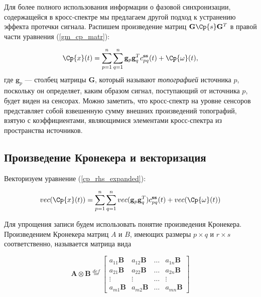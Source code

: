 Для более полного использования информации о фазовой синхронизации, содержащейся в кросс-спектре
мы предлагаем другой подход к устранению эффекта протечки сигнала.
Распишем  произведение матриц $\mathbf{G} \Cp{s} \mathbf{G}^T$ в правой части уравнения (\ref{gm_cp_matr}):

\begin{gather}
    \Cp{x}(t) = \sum\limits_{p=1}^n\sum\limits_{q=1}^n\mathbf{g}_p\mathbf{g}_q^T c_{pq}^{\mathbf{ss}}(t) + \Cp{\omega}(t),
    \label{cp_rhs_expanded}
\end{gather}
где $\mathbf{g}_p$ --- столбец матрицы $\mathbf{G}$, который называют \emph{топографией} источника $p$,
поскольку он определяет, каким образом сигнал, поступающий от источника $p$, будет виден на сенсорах.
Можно заметить, что кросс-спектр на уровне сенсоров представляет собой взвешенную сумму внешних произведений топографий,
взятую с коэффициентами, являющимися элементами кросс-спектра из пространства источников.

\subsection{Произведение Кронекера и векторизация}
Векторизуем уравнение (\ref{cp_rhs_expanded}):

\begin{gather}
    vec(\Cp{x}(t)) = \sum\limits_{p=1}^n\sum\limits_{q=1}^n vec(\mathbf{g}_p\mathbf{g}_q^T) c_{pq}^{\mathbf{ss}}(t) + vec(\Cp{\omega}(t))
    \label{cp_rhs_vec}
\end{gather}

Для упрощения записи будем использовать понятие произведения Кронекера.
Произведением Кронекера матриц $A$ и $B$, имеющих размеры $p\times q$ и $r\times s$ соответственно, называется матрица вида

\begin{equation}
    \mathbf{A} \otimes \mathbf{B} \stackrel{def}{=}
    \begin{bmatrix}
        a_{11} \mathbf{B} & a_{12} \mathbf{B} & \dots & a_{1n} \mathbf{B} \\
        a_{21} \mathbf{B} & a_{22} \mathbf{B} & \dots & a_{2n} \mathbf{B} \\
        \vdots            & \vdots            & \dots & \vdots            \\
        a_{m1} \mathbf{B} & a_{m2} \mathbf{B} & \dots & a_{mn} \mathbf{B}
        \label{kron_def}
     \end{bmatrix}
\end{equation}

